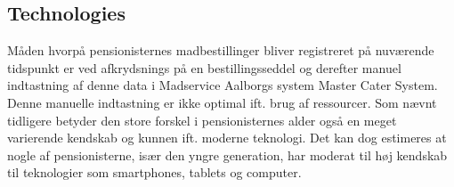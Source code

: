 \subsection{Technologies}
Måden hvorpå pensionisternes madbestillinger bliver registreret på nuværende tidspunkt er ved afkrydsnings på en bestillingsseddel og derefter manuel indtastning af denne data i Madservice Aalborgs system Master Cater System.
Denne manuelle indtastning er ikke optimal ift. brug af ressourcer.
Som nævnt tidligere betyder den store forskel i pensionisternes alder også en meget varierende kendskab og kunnen ift. moderne teknologi.
Det kan dog estimeres at nogle af pensionisterne, især den yngre generation, har moderat til høj kendskab til teknologier som smartphones, tablets og computer. 
